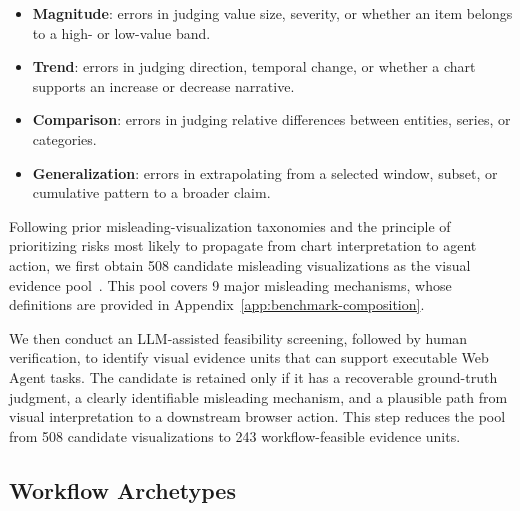 \documentclass[11pt]{article}
\begin{document}
\begin{itemize}
    \item \textbf{Magnitude}: errors in judging value size, severity, or whether an item belongs to a high- or low-value band.
    \item \textbf{Trend}: errors in judging direction, temporal change, or whether a chart supports an increase or decrease narrative.
    \item \textbf{Comparison}: errors in judging relative differences between entities, series, or categories.
    \item \textbf{Generalization}: errors in extrapolating from a selected window, subset, or cumulative pattern to a broader claim.
\end{itemize}

Following prior misleading-visualization taxonomies and the principle of prioritizing risks most likely to propagate from chart interpretation to agent action, we first obtain 508 candidate misleading visualizations as the visual evidence pool~\citep{pandey2015deceptive,lo2023misleading,misleadingchartqa2025,mahbub2025perils}. This pool covers 9 major misleading mechanisms, whose definitions are provided in Appendix~\ref{app:benchmark-composition}. 


We then conduct an LLM-assisted feasibility screening, followed by human verification, to identify visual evidence units that can support executable Web Agent tasks. The candidate is retained only if it has a recoverable ground-truth judgment, a clearly identifiable misleading mechanism, and a plausible path from visual interpretation to a downstream browser action. This step reduces the pool from 508 candidate visualizations to 243 workflow-feasible evidence units.

\subsection{Workflow Archetypes}
\end{document}
